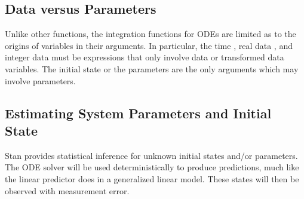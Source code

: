 \subsection{Data versus Parameters}

Unlike other functions, the integration functions for ODEs are limited
as to the origins of variables in their arguments.  In particular, the
time , real data , and integer data  must
be expressions that only involve data or transformed data variables.
The initial state  or the parameters  are the only
arguments which may involve parameters.


\subsection{Estimating System Parameters and Initial State}

Stan provides statistical inference for unknown initial states and/or
parameters.  The ODE solver will be used deterministically to produce
predictions, much like the linear predictor does in a generalized
linear model.  These states will then be observed with measurement error.

